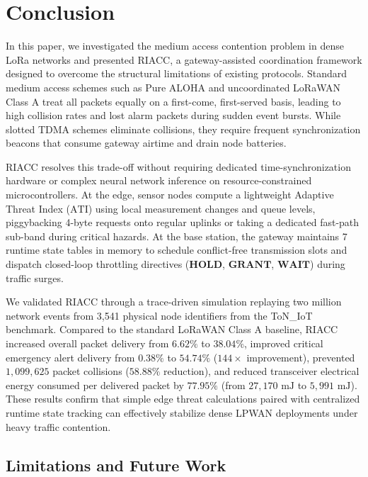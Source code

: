 \documentclass[preprint,review,12pt]{elsarticle}
\begin{document}
\section{Conclusion}
\label{sec:conclusion}

In this paper, we investigated the medium access contention problem in dense LoRa networks and presented RIACC, a gateway-assisted coordination framework designed to overcome the structural limitations of existing protocols. Standard medium access schemes such as Pure ALOHA and uncoordinated LoRaWAN Class A treat all packets equally on a first-come, first-served basis, leading to high collision rates and lost alarm packets during sudden event bursts. While slotted TDMA schemes eliminate collisions, they require frequent synchronization beacons that consume gateway airtime and drain node batteries. 

RIACC resolves this trade-off without requiring dedicated time-synchronization hardware or complex neural network inference on resource-constrained microcontrollers. At the edge, sensor nodes compute a lightweight Adaptive Threat Index ($\text{ATI}$) using local measurement changes and queue levels, piggybacking 4-byte requests onto regular uplinks or taking a dedicated fast-path sub-band during critical hazards. At the base station, the gateway maintains 7 runtime state tables in memory to schedule conflict-free transmission slots and dispatch closed-loop throttling directives ($\textbf{HOLD}$, $\textbf{GRANT}$, $\textbf{WAIT}$) during traffic surges. 

We validated RIACC through a trace-driven simulation replaying two million network events from 3,541 physical node identifiers from the ToN\_IoT benchmark. Compared to the standard LoRaWAN Class A baseline, RIACC increased overall packet delivery from $6.62\%$ to $38.04\%$, improved critical emergency alert delivery from $0.38\%$ to $54.74\%$ ($144\times$ improvement), prevented $1,099,625$ packet collisions ($58.88\%$ reduction), and reduced transceiver electrical energy consumed per delivered packet by $77.95\%$ (from $27,170\text{ mJ}$ to $5,991\text{ mJ}$). These results confirm that simple edge threat calculations paired with centralized runtime state tracking can effectively stabilize dense LPWAN deployments under heavy traffic contention.

\subsection*{Limitations and Future Work}
\end{document}
